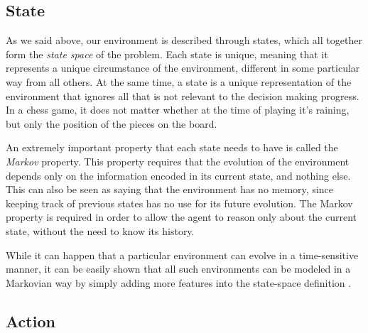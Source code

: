 \subsection{State}

As we said above, our environment is described through states, which all together form the
\textit{state space} of the problem. Each state is unique, meaning that it represents a unique
circumstance of the environment, different in some particular way from all others. At the same time,
a state is a unique representation of the environment that ignores all that is not relevant to the
decision making progress. In a chess game, it does not matter whether at the time of playing it's
raining, but only the position of the pieces on the board.


An extremely important property that each state needs to have is called the \textit{Markov}
property. This property requires that the evolution of the environment depends only on the
information encoded in its current state, and nothing else. This can also be seen as saying that the
environment has no memory, since keeping track of previous states has no use for its future
evolution. The Markov property is required in order to allow the agent to reason only about the
current state, without the need to know its history.

While it can happen that a particular environment can evolve in a time-sensitive manner, it can be
easily shown that all such environments can be modeled in a Markovian way by simply adding more
features into the state-space definition \cite{cit:boutilier}.

\subsection{Action}

